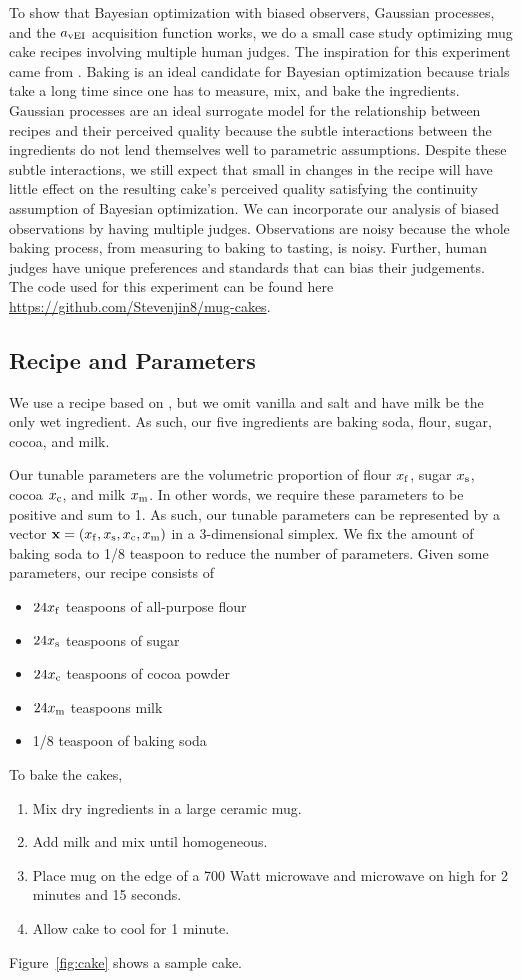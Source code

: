 To show that Bayesian optimization with biased observers, Gaussian processes, and the $a_{\vei}$ acquisition function works,
we do a small case study optimizing mug cake recipes involving multiple human judges.
The inspiration for this experiment came from \cite{Solnik2017}.
Baking is an ideal candidate for Bayesian optimization because
trials take a long time since one has to measure, mix, and bake the ingredients.
Gaussian processes are an ideal surrogate model for the relationship between recipes
and their perceived quality because
the subtle interactions between the ingredients 
do not lend themselves well to parametric assumptions.
Despite these subtle interactions, we still expect that small in changes in the recipe will have little effect on the resulting cake's perceived quality satisfying the continuity assumption of Bayesian optimization.
We can incorporate our analysis of biased observations by having multiple judges.
Observations are noisy because the whole baking process, from measuring to baking to tasting, is noisy.
Further, human judges have unique preferences and standards that can bias their judgements.
The code used for this experiment can be found here \url{https://github.com/Stevenjin8/mug-cakes}.

\subsection{Recipe and Parameters}\label{ssec:recip}

We use a recipe based on \cite{mugcake}, but we omit vanilla and salt and have milk be the only wet ingredient.
As such, our five ingredients are baking soda, flour, sugar, cocoa, and milk.

Our tunable parameters are the volumetric proportion of flour $x_\ff$, sugar $x_\ss$, cocoa $x_\cc$, and milk $x_\mm$.
In other words, we require these parameters to be positive and sum to 1.
As such, our tunable parameters can be represented by a vector $\mathbf{x} = (x_\ff, x_\ss, x_\cc,x_\mm)$ in a 3-dimensional simplex.
We fix the amount of baking soda to 1/8 teaspoon to reduce the number of parameters.
Given some parameters, our recipe consists of
\begin{itemize}
    \item $24x_\ff$ teaspoons of all-purpose flour
    \item $24x_\ss$ teaspoons of sugar
    \item $24x_\cc$ teaspoons of cocoa powder
    \item $24x_\mm$ teaspoons milk
    \item 1/8 teaspoon of baking soda
\end{itemize}
To bake the cakes,
\begin{enumerate}
    \item Mix dry ingredients in a large ceramic mug.
    \item Add milk and mix until homogeneous.
    \item Place mug on the edge of a 700 Watt microwave and microwave on high for 2 minutes and 15 seconds.
    \item Allow cake to cool for 1 minute.
\end{enumerate}
Figure~\ref{fig:cake} shows a sample cake.

